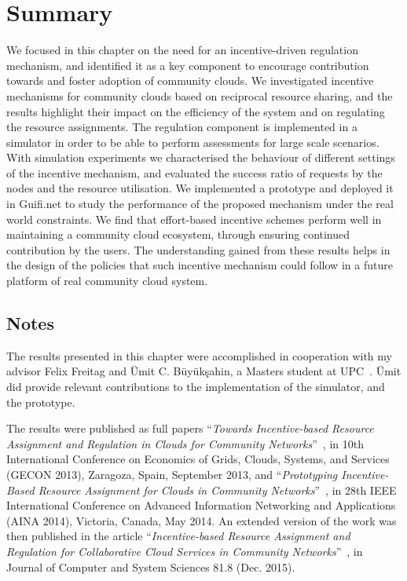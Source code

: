 
\section{Summary}
\label{sec__incentvives_conclusion}

We focused in this chapter on the need for an incentive-driven regulation mechanism, 
and identified it as a key component to encourage contribution towards and foster adoption of community clouds. 
We investigated incentive mechanisms for community clouds based on reciprocal resource sharing,
and the results highlight their impact on the efficiency of the system and on regulating the resource assignments. 
The regulation component is implemented in a simulator in order to be able to perform assessments for large scale scenarios. 
With simulation experiments we characterised the behaviour of different settings of the incentive mechanism,
and evaluated the success ratio of requests by the nodes and the resource utilisation. 
We implemented a prototype and deployed it in Guifi.net 
to study the performance of the proposed mechanism under the real world constraints.
We find that effort-based incentive schemes perform well in maintaining a community cloud ecosystem, through ensuring continued contribution by the users.
The understanding gained from these results helps in the 
design of the policies that such incentive mechanism could 
follow in a future platform of real community cloud system. 

\subsection*{Notes}
The results presented in this chapter were accomplished in cooperation 
with my advisor Felix Freitag and 
\"Umit C. B\"uy\"uk\c{s}ahin, a Masters student at UPC~\cite{Buyuksahin2013Thesis}. 
\"Umit did provide relevant contributions to the implementation of the simulator, and the prototype.

The results were published as full papers
	\enquote{\emph{Towards Incentive-based Resource Assignment and Regulation in Clouds for Community Networks}}~\cite{Khan2013TowardsIncentives},
	 in 10th International Conference on Economics of Grids, Clouds, Systems, and Services (GECON 2013),
	 Zaragoza, Spain, September 2013, 
	 and \enquote{\emph{Prototyping Incentive-Based Resource Assignment for Clouds in Community Networks}}~\cite{Khan2014Prototyping},
	 in 28th IEEE International Conference on Advanced Information Networking and Applications (AINA 2014), 
	 Victoria, Canada, May 2014.
An extended version of the work was then published in the article 
	\enquote{\emph{Incentive-based Resource Assignment and Regulation for Collaborative Cloud Services in Community Networks}}~\cite{Khan2015Incentive}, 
	in Journal of Computer and System Sciences 81.8 (Dec. 2015).